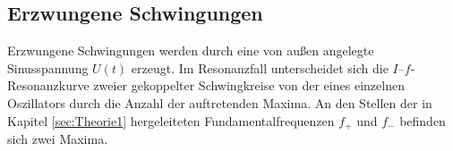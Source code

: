 \subsection{Erzwungene Schwingungen}
\label{sec:erzwungen}
Erzwungene Schwingungen werden durch eine von außen angelegte Sinusspannung $U(t)$ erzeugt.
Im Resonanzfall unterscheidet sich die $I–f$-Resonanzkurve zweier gekoppelter Schwingkreise von der eines einzelnen Oszillators durch die Anzahl der auftretenden Maxima. An den Stellen der in Kapitel \ref{sec:Theorie1} hergeleiteten Fundamentalfrequenzen $f_+$ und $f_-$ befinden sich zwei Maxima.
